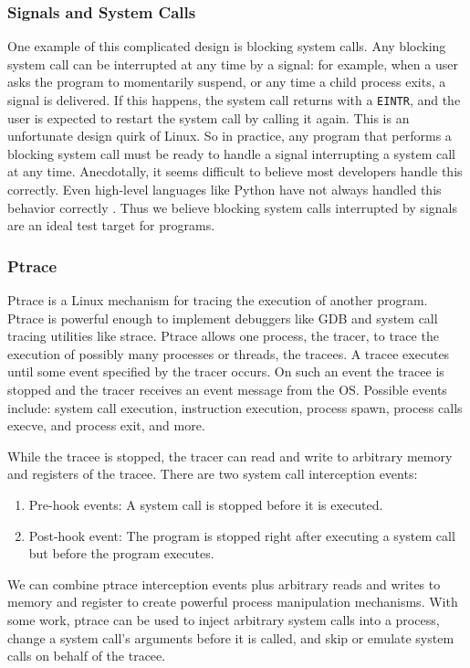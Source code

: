 \subsubsection{Signals and System Calls}
\label{blockingandsignals}
One example of this complicated design is blocking system calls. Any blocking system call can be interrupted at any time by a signal: for example, when a user asks the program to momentarily suspend, or any time a child process exits, a signal is delivered. If this happens, the system call returns with a \texttt{EINTR}, and the user is expected to restart the system call by calling it again. This is an unfortunate design quirk of Linux. So in practice, any program that performs a blocking system call must be ready to handle a signal interrupting a system call at any time. Anecdotally, it seems difficult to believe most developers handle this correctly. Even high-level languages like Python have not always handled this behavior correctly \cite{pep}. Thus we believe blocking system calls interrupted by signals are an ideal test target for programs.

\subsubsection{Ptrace}
Ptrace is a Linux mechanism for tracing the execution of another program. Ptrace     is powerful enough to implement debuggers like GDB and system call tracing utilities     like strace. Ptrace allows one process, the tracer, to trace the execution of possibly     many processes or threads, the tracees. A tracee executes until some event specified by the tracer occurs. On such an event the tracee is stopped and the tracer receives an event message from the OS. Possible events include: system call execution, instruction execution, process spawn, process calls execve, and process exit, and more.

While the tracee is stopped, the tracer can read and write to arbitrary memory and registers of the tracee. There are two system call interception events:
\begin{enumerate}
     \item Pre-hook events: A system call is stopped before it is executed.
     \item Post-hook event: The program is stopped right after executing a system call but before the program executes.
\end{enumerate}
     We can combine ptrace interception events plus arbitrary reads and writes to memory and register to create powerful process manipulation mechanisms. With some work, ptrace can be used to inject arbitrary system calls into a process, change a system call's arguments before it is called, and skip or emulate system calls on behalf of the tracee.
